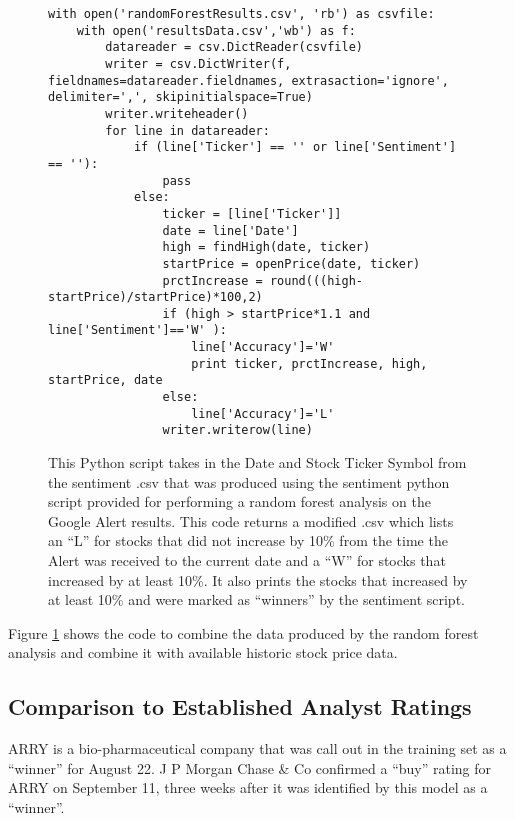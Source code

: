 \documentclass[sigconf]{acmart}
\begin{document}
\begin{figure}[htb]
\begin{verbatim}
with open('randomForestResults.csv', 'rb') as csvfile:
	with open('resultsData.csv','wb') as f:
		datareader = csv.DictReader(csvfile)
		writer = csv.DictWriter(f, fieldnames=datareader.fieldnames, extrasaction='ignore', delimiter=',', skipinitialspace=True)
		writer.writeheader()
		for line in datareader:
			if (line['Ticker'] == '' or line['Sentiment'] == ''):
				pass
			else:
				ticker = [line['Ticker']]
				date = line['Date']
				high = findHigh(date, ticker)
				startPrice = openPrice(date, ticker)
				prctIncrease = round(((high-startPrice)/startPrice)*100,2)
				if (high > startPrice*1.1 and line['Sentiment']=='W' ):
					line['Accuracy']='W'
					print ticker, prctIncrease, high, startPrice, date
				else:
					line['Accuracy']='L'
				writer.writerow(line)
\end{verbatim}
\caption{This Python script takes in the Date and Stock Ticker Symbol from the sentiment .csv that was produced using the sentiment python script provided for performing a random forest analysis on the Google Alert results. This code returns a modified .csv which lists an ``L'' for stocks that did not increase by 10\% from the time the Alert was received to the current date and a ``W'' for stocks that increased by at least 10\%. It also prints the stocks that increased by at least 10\%  and were marked as ``winners'' by the sentiment script.}\label{c:result}
\end{figure}

Figure \ref{c:result} shows the code to combine the data produced by the random forest analysis and combine it with available historic stock price data.

\subsection{Comparison to Established Analyst Ratings}

ARRY is a bio-pharmaceutical company that was call out in the training set as a ``winner'' for August 22. J P Morgan Chase \& Co confirmed a ``buy'' rating for ARRY on September 11, three weeks after it was identified by this model as a ``winner''.

\end{document}
